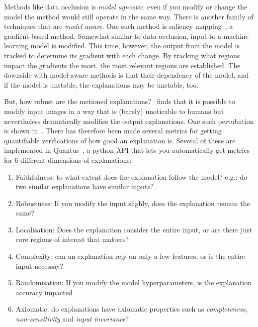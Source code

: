 \documentclass[10pt,twocolumn,letterpaper]{article}
\begin{document}
Methods like data occlusion is \textit{model agnostic}: even if you modify or change the model the method would still operate in the same way. There is another family of techniques that are \textit{model aware}. One such method is saliency mapping~\cite{simonyan2014deep}, a gradient-based method. Somewhat similar to data occlusion, input to a machine learning model is modified. This time, however, the output from the model is tracked to determine its gradient with each change. By tracking what regions impact the gradients the most, the most relevant regions are established. The downside with model-aware methods is that their dependency of the model, and if the model is unstable, the explanations may be unstable, too.

But, how robust are the metioned explanations?~\cite{geometryToBlame} finds that it is possible to modify input images in a way that is (barely) unoticable to humans but nevertheless dramatically modifies the output explanations. One such pertubation is shown in~. There has therefore been made several metrics for getting quantifiable verifications of how good an explanation is. Several of these are implemented in Quantus~\cite{hedstrom2023quantus}, a python API that lets you automatically get metrics for 6 different dimensions of explanations:
\begin{enumerate}
  \item Faithfulness: to what extent does the explanation follow the model? e.g.: do two similar explanations have similar inputs?
  \item Robustness: If you modify the input slighly, does the explanation remain the same?
  \item Localisation: Does the explanation consider the entire input, or are there just core regions of interest that matters?
  \item Complexity: can an explanation rely on only a few features, or is the entire input necessay?
  \item Randomisation: If you modify the model hyperparameters, is the explanation accuracy impacted
  \item Axiomatic: do explanations have axiomatic properties such as \textit{completeness}, \textit{non-sensitivity} and \textit{input invariance}?
\end{enumerate}
\end{document}
